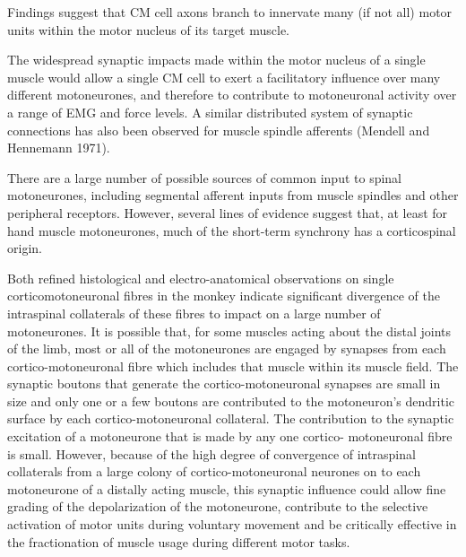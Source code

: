 {            Findings suggest that CM cell axons branch to innervate many
            (if not all) motor units within the motor nucleus of its
            target muscle.

            The widespread synaptic impacts made within the motor
            nucleus of a single muscle would allow a single CM cell to
            exert a facilitatory influence over many different
            motoneurones, and therefore to contribute to motoneuronal
            activity over a range of EMG and force levels. A similar
            distributed system of synaptic connections has also been
            observed for muscle spindle afferents (Mendell and Hennemann
            1971).

            There are a large number of possible sources of common input
            to spinal motoneurones, including segmental afferent inputs
            from muscle spindles and other peripheral receptors.
            However, several lines of evidence suggest that, at least
            for hand muscle motoneurones, much of the short-term
            synchrony has a corticospinal origin.

            Both refined histological and electro-anatomical
            observations on single corticomotoneuronal fibres in the
            monkey indicate significant divergence of the intraspinal
            collaterals of these fibres to impact on a large number of
            motoneurones. It is possible that, for some muscles acting
            about the distal joints of the limb, most or all of the
            motoneurones are engaged by synapses from each
            cortico-motoneuronal fibre which includes that muscle within
            its muscle field. The synaptic boutons that generate the
            cortico-motoneuronal synapses are small in size and only one
            or a few boutons are contributed to the motoneuron's
            dendritic surface by each cortico-motoneuronal collateral.
            The contribution to the synaptic excitation of a motoneurone
            that is made by any one cortico- motoneuronal fibre is
            small. However, because of the high degree of convergence of
            intraspinal collaterals from a large colony of
            cortico-motoneuronal neurones on to each motoneurone of a
            distally acting muscle, this synaptic influence could allow
            fine grading of the depolarization of the motoneurone,
            contribute to the selective activation of motor units during
            voluntary movement and be critically effective in the
            fractionation of muscle usage during different motor tasks.

}
